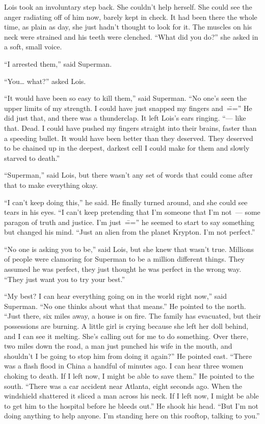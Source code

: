 \documentclass[ebook,12pt]{memoir}
\begin{document}
Lois took an involuntary step back. She couldn't help herself. She could
see the anger radiating off of him now, barely kept in check. It had
been there the whole time, as plain as day, she just hadn't thought to
look for it. The muscles on his neck were strained and his teeth were
clenched. ``What did you do?'' she asked in a soft, small voice.

``I arrested them,'' said Superman.

``You\ldots{} what?'' asked Lois.

``It would have been so easy to kill them,'' said Superman. ``No one's
seen the upper limits of my strength. I could have just snapped my
fingers and~\==='' He did just that, and there was a thunderclap. It left
Lois's ears ringing. ``--- like that. Dead. I could have pushed my
fingers straight into their brains, faster than a speeding bullet. It
would have been better than they deserved. They deserved to be chained
up in the deepest, darkest cell I could make for them and slowly starved
to death.''

``Superman,'' said Lois, but there wasn't any set of words that could
come after that to make everything okay.

``I can't keep doing this,'' he said. He finally turned around, and she
could see tears in his eyes. ``I can't keep pretending that I'm someone
that I'm not~--- some paragon of truth and justice. I'm just~\==='' he
seemed to start to say something but changed his mind. ``Just an alien
from the planet Krypton. I'm not perfect.''

``No one is asking you to be,'' said Lois, but she knew that wasn't
true. Millions of people were clamoring for Superman to be a million
different things. They assumed he was perfect, they just thought he was
perfect in the wrong way. ``They just want you to try your best.''

``My best? I can hear everything going on in the world right now,'' said
Superman. ``No one thinks about what that means.'' He pointed to the
north. ``Just there, six miles away, a house is on fire. The family has
evacuated, but their possessions are burning. A little girl is crying
because she left her doll behind, and I can see it melting. She's
calling out for me to do something. Over there, two miles down the road,
a man just punched his wife in the mouth, and shouldn't I be going to
stop him from doing it again?'' He pointed east. ``There was a flash
flood in China a handful of minutes ago. I can hear three women choking
to death. If I left now, I might be able to save them.'' He pointed to
the south. ``There was a car accident near Atlanta, eight seconds ago.
When the windshield shattered it sliced a man across his neck. If I left
now, I might be able to get him to the hospital before he bleeds out.''
He shook his head. ``But I'm not doing anything to help anyone. I'm
standing here on this rooftop, talking to you.''
\end{document}
